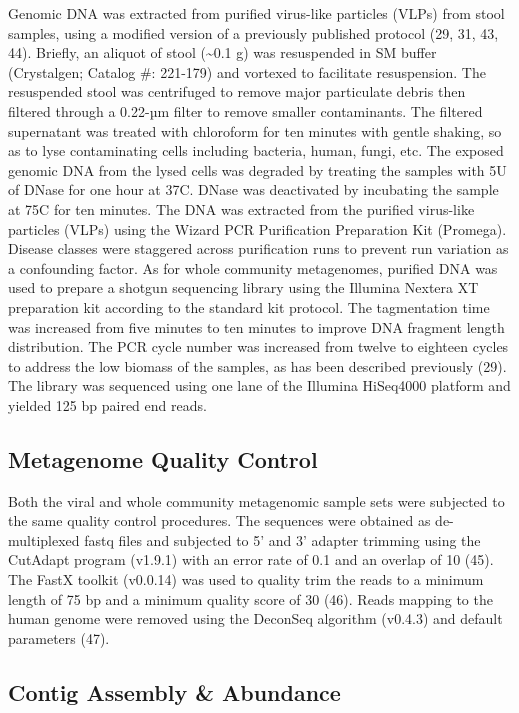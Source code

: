 \documentclass[12pt,]{article}
\begin{document}
Genomic DNA was extracted from purified virus-like particles (VLPs) from
stool samples, using a modified version of a previously published
protocol (29, 31, 43, 44). Briefly, an aliquot of stool
(\textasciitilde{}0.1 g) was resuspended in SM buffer (Crystalgen;
Catalog \#: 221-179) and vortexed to facilitate resuspension. The
resuspended stool was centrifuged to remove major particulate debris
then filtered through a 0.22-µm filter to remove smaller contaminants.
The filtered supernatant was treated with chloroform for ten minutes
with gentle shaking, so as to lyse contaminating cells including
bacteria, human, fungi, etc. The exposed genomic DNA from the lysed
cells was degraded by treating the samples with 5U of DNase for one hour
at 37C. DNase was deactivated by incubating the sample at 75C for ten
minutes. The DNA was extracted from the purified virus-like particles
(VLPs) using the Wizard PCR Purification Preparation Kit (Promega).
Disease classes were staggered across purification runs to prevent run
variation as a confounding factor. As for whole community metagenomes,
purified DNA was used to prepare a shotgun sequencing library using the
Illumina Nextera XT preparation kit according to the standard kit
protocol. The tagmentation time was increased from five minutes to ten
minutes to improve DNA fragment length distribution. The PCR cycle
number was increased from twelve to eighteen cycles to address the low
biomass of the samples, as has been described previously (29). The
library was sequenced using one lane of the Illumina HiSeq4000 platform
and yielded 125 bp paired end reads.

\subsection{Metagenome Quality
Control}\label{metagenome-quality-control}

Both the viral and whole community metagenomic sample sets were
subjected to the same quality control procedures. The sequences were
obtained as de-multiplexed fastq files and subjected to 5' and 3'
adapter trimming using the CutAdapt program (v1.9.1) with an error rate
of 0.1 and an overlap of 10 (45). The FastX toolkit (v0.0.14) was used
to quality trim the reads to a minimum length of 75 bp and a minimum
quality score of 30 (46). Reads mapping to the human genome were removed
using the DeconSeq algorithm (v0.4.3) and default parameters (47).

\subsection{Contig Assembly \&
Abundance}\label{contig-assembly-abundance}
\end{document}
